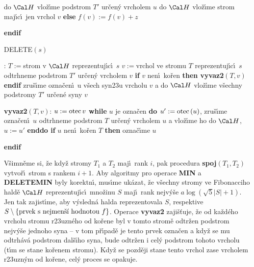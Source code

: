 \phantom{------}do $\Cal H$ vlo\v z\'\i me podstrom $T'$ ur\v cen\'y vrcholem $u$\newline 
\phantom{---}{\bf enddo\newline}
\phantom{---}do $\Cal H$ vlo\v z\'\i me strom maj\'\i c\'\i\ jen vrchol $v$\newline
{\bf else}\newline 
\phantom{---}$f\left(v\right):=f\left(v\right)+z$\newline 
{\bf endif
\bigskip

DELETE$\left(s\right)$}:\newline 
$T:=$strom v $\Cal H$ reprezentuj\'\i c\'\i\ $s$\newline 
$v:=$vrchol ve stromu $T$ reprezentuj\'\i c\'\i\ $s$\newline 
odtrhneme podstrom $T'$ ur\v cen\'y vrcholem $v$\newline 
{\bf if} $v$ nen\'\i\ ko\v ren {\bf then vyvaz2$\left(T,v\right)$ endif}\newline 
zru\v s\'\i me ozna\v cen\'\i\ u v\v sech syn\accent23u vrcholu $
v$ a\newline 
do $\Cal H$ vlo\v z\'\i me v\v sechny podstromy $T'$ ur\v cen\'e syny $
v$
\bigskip

{\bf vyvaz2$\left(T,v\right)$}:\newline 
$u:=\operatorname{otec} v$\newline 
{\bf while} $u$ je ozna\v cen {\bf do\newline 
\phantom{---}$u':=\operatorname{otec}\left(u\right)$}, zru\v s\'\i me ozna\v cen\'\i\ $u$\newline 
\phantom{---}odtrhneme podstrom $T$ ur\v cen\'y vrcholem $u$ a vlo\v z\'\i me ho 
do $\Cal H$, $u:=u'$\newline 
{\bf enddo\newline 
if} $u$ nen\'\i\ ko\v ren $T$ {\bf then} ozna\v c\'\i me $u$ {\bf endif
\medskip

}\flushpar V\v simn\v eme si, \v ze kdy\v z stromy $T_1$ a $T_2$ maj\'\i\ rank 
$i$, pak procedura {\bf spoj$\left(T_1,T_2\right)$} vytvo\v r\'\i\ strom s rankem 
$i+1$.  Aby algoritmy pro operace {\bf MIN} a {\bf DELETEMIN} byly 
korektn\'\i , mus\'\i me uk\'azat, \v ze v\v sechny stromy ve 
Fibonacciho hald\v e $\Cal H$ reprezentuj\'\i c\'\i\ mno\v zinu $
S$ maj\'\i\ rank 
nejv\'y\v se $a\log\left(\sqrt 5|S|+1\right)$. Jen tak zajist\'\i me, aby v\'ysledn\'a 
halda reprezentovala $S$, res\-pektive 
$S\setminus \left\{\text{\rm prvek s nejmen\v s\'\i\ hodnotou }f\right\}$.  Operace {\bf vyvaz2 }
zaji\v s\v tuje, \v ze od ka\v zd\'eho vrcholu stromu r\accent23uzn\'eho 
od ko\v rene byl v tomto strom\v e odtr\v zen podstrom nejv\'y\v se 
jednoho syna -- v tom p\v r\'\i pad\v e je tento prvek ozna\v cen a 
kdy\v z se mu odtrh\'av\'a podstrom dal\v s\'\i ho syna, bude odtr\v zen 
i cel\'y podstrom tohoto vrcholu (t\'\i m se stane ko\v renem 
stromu).  Kdy\v z se pozd\v eji stane tento vrchol zase 
vrcholem r\accent23uzn\'ym od ko\v rene, cel\'y proces se 
opakuje. 
\medskip

